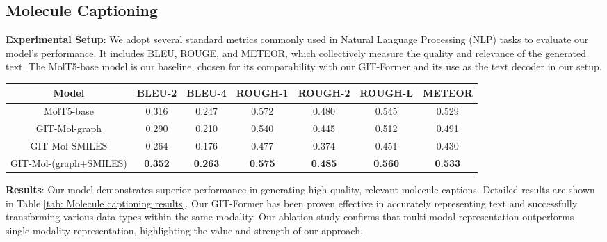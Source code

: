 \documentclass{article}
\begin{document}
\subsection{Molecule Captioning}

\textbf{Experimental Setup}: We adopt several standard metrics commonly used in Natural Language Processing (NLP) tasks to evaluate our model's performance. It includes BLEU, ROUGE, and METEOR, which collectively measure the quality and relevance of the generated text. The MolT5-base model is our baseline, chosen for its comparability with our GIT-Former and its use as the text decoder in our setup.
\begin{table*}[t]
	\centering
    \caption{\textbf{Molecule captioning results}. GIT-Mol demonstrates exceptional performance across various caption generation evaluation metrics. In an ablation study, the employment of this multi-modal model resulted in an impressive 10\%-15\% improvement over single-modality models.}
    \label{tab: Molecule captioning results}  
	\begin{tabular}{c|c|c|c|c|c|c}
	\hline
	\textbf{Model} & \textbf{BLEU-2} & \textbf{BLEU-4} & \textbf{ROUGH-1} & \textbf{ROUGH-2} & \textbf{ROUGH-L} & \textbf{METEOR}\\
		\hline
		MolT5-base & 0.316 & 0.247 & 0.572 & 0.480 & 0.545 & 0.529\\	\hline
		GIT-Mol-graph & 0.290  & 0.210 & 0.540 & 0.445 & 0.512 & 0.491\\
            GIT-Mol-SMILES & 0.264  & 0.176 & 0.477 & 0.374 & 0.451 & 0.430\\
            GIT-Mol-(graph+SMILES) & \textbf{0.352}  & \textbf{0.263} & \textbf{0.575} & \textbf{0.485}& \textbf{0.560} & \textbf{0.533}\\
		\hline
	\end{tabular}
\end{table*}

\textbf{Results}: Our model demonstrates superior performance in generating high-quality, relevant molecule captions. Detailed results are shown in Table \ref{tab: Molecule captioning results}.
Our GIT-Former has been proven effective in accurately representing text and successfully transforming various data types within the same modality. Our ablation study confirms that multi-modal representation outperforms single-modality representation, highlighting the value and strength of our approach.
\end{document}
